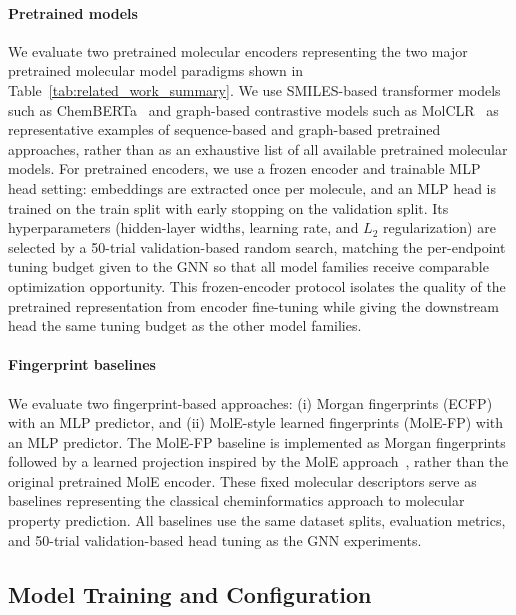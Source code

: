 \documentclass[journal]{IEEEtran}
\begin{document}
\paragraph{Pretrained models}
We evaluate two pretrained molecular encoders representing the two major pretrained molecular model paradigms shown in Table~\ref{tab:related_work_summary}. We use SMILES-based transformer models such as ChemBERTa~\cite{chemberta2} and graph-based contrastive models such as MolCLR~\cite{molclr} as representative examples of sequence-based and graph-based pretrained approaches, rather than as an exhaustive list of all available pretrained molecular models. For pretrained encoders, we use a frozen encoder and trainable MLP head setting: embeddings are extracted once per molecule, and an MLP head is trained on the train split with early stopping on the validation split. Its hyperparameters (hidden-layer widths, learning rate, and $L_2$ regularization) are selected by a 50-trial validation-based random search, matching the per-endpoint tuning budget given to the GNN so that all model families receive comparable optimization opportunity. This frozen-encoder protocol isolates the quality of the pretrained representation from encoder fine-tuning while giving the downstream head the same tuning budget as the other model families.

\paragraph{Fingerprint baselines}
We evaluate two fingerprint-based approaches: (i) Morgan fingerprints (ECFP)~\cite{rogers2010ecfp} with an MLP predictor, and (ii) MolE-style learned fingerprints (MolE-FP) with an MLP predictor. The MolE-FP baseline is implemented as Morgan fingerprints followed by a learned projection inspired by the MolE approach~\cite{molE}, rather than the original pretrained MolE encoder. These fixed molecular descriptors serve as baselines representing the classical cheminformatics approach to molecular property prediction. All baselines use the same dataset splits, evaluation metrics, and 50-trial validation-based head tuning as the GNN experiments.




\subsection{Model Training and Configuration}
\label{sec:model_training}
\end{document}
